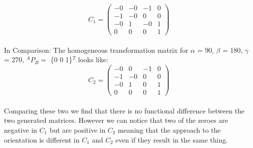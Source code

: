 		$$
		C_{1} =
		\begin{pmatrix}
			-0 & -0 & -1 & 0\\
			-1 & -0 & 0 & 0\\
			-0  & 1  & -0 & 1\\
			0 & 0 & 0 & 1
		\end{pmatrix}
		$$		
		\\
		In Comparison:
		The homogeneous transformation matrix for\newline
		$\alpha$ = 90\degree, 
		$\beta$ = 180\degree, 
		$\gamma$ = 270\degree, $^{A}P_{B} =$ \{0 0 1\}$^{T}$\newline
		looks like:\\
		
		$$
		C_{2} =
		\begin{pmatrix}
			-0 & 0 & -1 & 0\\
			-1 & -0 & 0 & 0\\
			-0  & 1  & 0 & 1\\
			0 & 0 & 0 & 1
		\end{pmatrix}
		$$		
		\\
		Comparing these two we find that there is no functional difference between the two generated matrices. However we can notice that two of the zeroes are negative in $C_{1}$ but are positive in $C_{2}$ meaning that the approach to the orientation is different in $C_{1}$ and $C_{2}$ even if they result in the same thing.